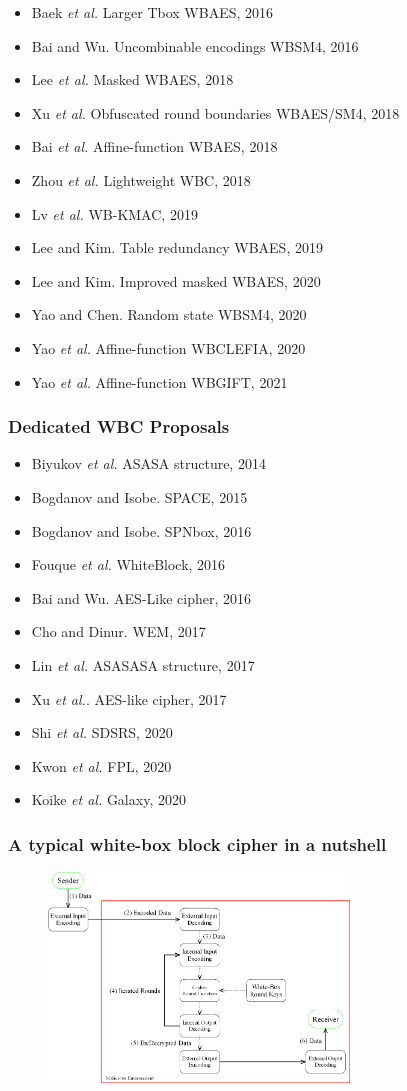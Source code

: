 \documentclass{beamer}
\begin{document}
\frame
{
 \begin{itemize}
  \item Baek \textit{et al.} Larger Tbox WBAES, 2016
  \item Bai and Wu. Uncombinable encodings WBSM4, 2016
  \item Lee \textit{et al.} Masked WBAES, 2018
  \item Xu \textit{et al.} Obfuscated round boundaries WBAES/SM4, 2018
  \item Bai \textit{et al.} Affine-function WBAES, 2018
  \item Zhou \textit{et al.} Lightweight WBC, 2018
  \item Lv \textit{et al.} WB-KMAC, 2019
  \item Lee and Kim. Table redundancy WBAES, 2019
  \item Lee and Kim. Improved masked WBAES, 2020
  \item Yao and Chen. Random state WBSM4, 2020
  \item Yao \textit{et al.} Affine-function WBCLEFIA, 2020
  \item Yao \textit{et al.} Affine-function WBGIFT, 2021
 \end{itemize}
}

\frame
{
 \frametitle{Dedicated WBC Proposals}
 \begin{itemize}
  \item Biyukov \textit{et al.} ASASA structure, 2014
  \item Bogdanov and Isobe. SPACE, 2015
  \item Bogdanov and Isobe. SPNbox, 2016
  \item Fouque \textit{et al.} WhiteBlock, 2016
  \item Bai and Wu. AES-Like cipher, 2016
  \item Cho and Dinur. WEM, 2017
  \item Lin \textit{et al.} ASASASA structure, 2017
  \item Xu \textit{et al.}. AES-like cipher, 2017
  \item Shi \textit{et al.} SDSRS, 2020
  \item Kwon \textit{et al.} FPL, 2020
  \item Koike \textit{et al.} Galaxy, 2020
 \end{itemize}
}

\frame
{
\frametitle{A typical white-box block cipher in a nutshell}
\begin{figure}[htbp]
\centering
  \includegraphics[width=8cm]{./pics/WBCrypto_Functional_Model.png}

\end{figure}

}
\end{document}
